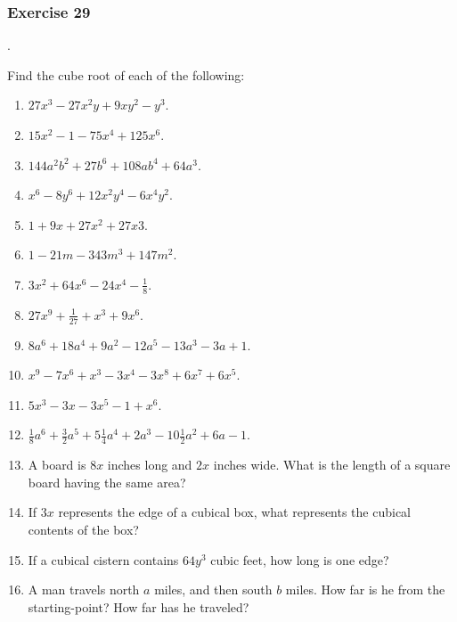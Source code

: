 \documentclass{book}
\begin{document}
\subsubsection*{Exercise 29}.

Find the cube root of each of the following:
\begin{enumerate}
\item $27 x^{3} - 27 x^{2} y + 9 x y^2 - y^{3}$.

\item $15 x^{2} - 1 - 75 x^{4} + 125 x^{6}$.

\item $144 a^{2} b^{2} + 27 b^{6} + 108 a b^{4} + 64 a^{3}$.

\item $x^{6} - 8 y^{6} + 12 x^{2} y^{4} - 6 x^{4} y^{2}$.

\item $1 + 9 x + 27 x^{2} + 27 x{3}$.

\item $1 - 21 m - 343 m^{3} + 147 m^{2}$.

\item $3 x^{2} + 64 x^{6} - 24 x^{4} - \frac{1}{8}$.

\item $27 x^{9} + \frac{1}{27} + x^{3} + 9 x^{6}$.

\item $8 a^{6} + 18 a^{4} + 9 a^{2} - 12 a^{5} - 13 a^{3} - 3 a +
1$.

\item $x^{9} - 7 x^{6} + x^{3} - 3 x^{4} - 3 x^{8} + 6 x^{7} + 6
x^{5}$.

\item $5 x^{3} - 3 x - 3 x^{5} - 1 + x^{6}$.

\item $\frac{1}{8} a^{6} + \frac{3}{2} a^{5} + 5 \frac{1}{4} a^{4}
 + 2 a^{3} - 10 \frac{1}{2} a^{2} + 6 a - 1$.

\item A board is $8 x$ inches long and $2 x$ inches wide. What is
the length of a square board having the same area?

\item If $3 x$ represents the edge of a cubical box, what
represents the cubical contents of the box?

\item If a cubical cistern contains $64y^3$ cubic feet, how long
is one edge?

\item A man travels north $a$ miles, and then south $b$ miles. How
far is he from the starting-point? How far has he traveled?
\end{enumerate}
\end{document}
